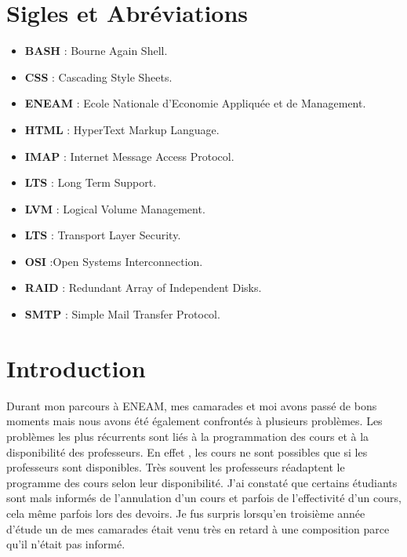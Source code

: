 \documentclass[a4paper,12pt,french]{report} %
\begin{document}
\chapter*{Sigles et Abréviations}
\begin{itemize}
\item[] \textbf{BASH} : Bourne Again Shell.
\item[] \textbf{CSS} : Cascading Style Sheets.
\item[] \textbf{ENEAM} : Ecole Nationale d'Economie Appliquée et de Management. %
\item[] \textbf{HTML} : HyperText Markup Language. %
\item[] \textbf{IMAP} : Internet Message Access Protocol.
\item[] \textbf{LTS} : Long Term Support.
\item[] \textbf{LVM} :  Logical Volume Management. %
\item[] \textbf{LTS} : Transport Layer Security.
\item[] \textbf{OSI} :Open Systems Interconnection.
\item[] \textbf{RAID} : Redundant Array of Independent Disks. %
\item[] \textbf{SMTP} : Simple Mail Transfer Protocol.
\end{itemize}

\renewcommand{\contentsname}{Table des matières}

\tableofcontents
{}
\listoffigures
\onehalfspacing %
\clearpage

\chapter*{Introduction}
Durant mon parcours à ENEAM, mes camarades et moi avons passé de bons moments mais nous avons été également confrontés à plusieurs problèmes. Les problèmes les plus récurrents sont liés à la programmation des cours et  à la disponibilité des professeurs. En effet , les cours ne sont possibles que si les professeurs sont disponibles. Très souvent les professeurs réadaptent le programme des cours selon leur disponibilité. %
 J'ai constaté que certains étudiants sont mals informés de l'annulation d'un cours et parfois de l'effectivité d'un cours, cela même parfois lors des devoirs. Je fus surpris lorsqu'en troisième année d'étude un de mes camarades était venu très en retard à une composition parce qu'il n'était pas informé.
	
\end{document}
